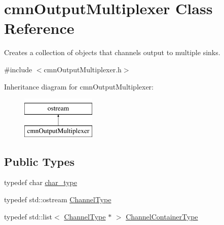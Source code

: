\hypertarget{classcmn_output_multiplexer}{\section{cmn\-Output\-Multiplexer Class Reference}
\label{classcmn_output_multiplexer}
}


Creates a collection of objects that channels output to multiple sinks.  




{\ttfamily \#include $<$cmn\-Output\-Multiplexer.\-h$>$}

Inheritance diagram for cmn\-Output\-Multiplexer\-:\begin{figure}[H]
\begin{center}
\leavevmode
\includegraphics[height=2.000000cm]{d5/d01/classcmn_output_multiplexer}
\end{center}
\end{figure}
\subsection*{Public Types}
\begin{DoxyCompactItemize}
\item 
typedef char \hyperlink{classcmn_output_multiplexer_aa35542dd7f4e6d55780bc7ed741910fe}{char\-\_\-type}
\item 
typedef std\-::ostream \hyperlink{classcmn_output_multiplexer_abebdbc4cebf9eeb2ce4159f2c649968e}{Channel\-Type}
\item 
typedef std\-::list$<$ \hyperlink{classcmn_output_multiplexer_abebdbc4cebf9eeb2ce4159f2c649968e}{Channel\-Type} $\ast$ $>$ \hyperlink{classcmn_output_multiplexer_aca2d6dc567cf721a0dbb2f887c175b7b}{Channel\-Container\-Type}
\end{DoxyCompactItemize}

